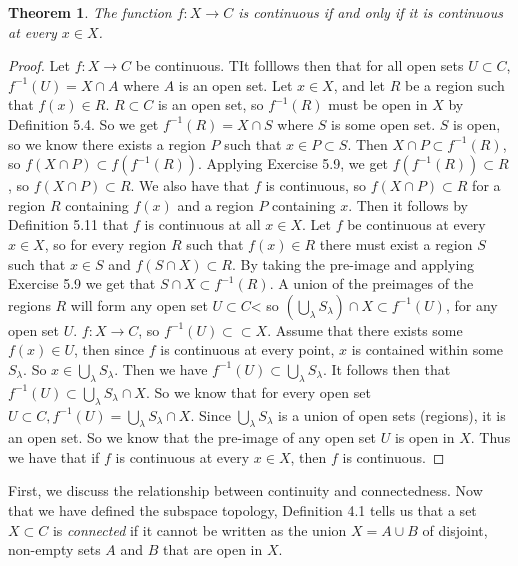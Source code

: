 \documentclass[12pt]{article}
\renewcommand{\_}[1]{\underline{ #1 }}
\newtheorem{theorem}{Theorem}[section]
\theoremstyle{definition}
\numberwithin{equation}{subsection}
\begin{document}
\begin{theorem}\label{reformulation}
The function $f\colon X\to C$ is continuous if and only if it is continuous at every $x\in X$. 
\end{theorem}

\begin{proof}
Let $f : X \to C$ be continuous. TIt folllows then that for all open sets $U \subset C$, $f^{-1}(U) = X \cap A$ where $A$ is an open set. Let $x \in X$, and let $R$ be a region such that $f(x) \in R$. $R \subset C$ is an open set, so $f^{-1}(R)$ must be open in $X$ by Definition 5.4. So we get $f^{-1}(R) = X \cap S$ where $S$ is some open set. $S$ is open, so we know there exists a region $P$ such that $x \in P \subset S$. Then $X \cap P \subset f^{-1}(R)$, so $f(X \cap P) \subset f(f^{-1}(R))$. Applying Exercise 5.9, we get $f(f^{-1}(R)) \subset R$, so $f(X \cap P) \subset R$. We also have that $f$ is continuous, so $f(X \cap P) \subset R$ for a region $R$ containing $f(x)$ and a region $P$ containing $x$. Then it follows by Definition 5.11 that $f$ is continuous at all $x \in X$.
\newline
Let $f$ be continuous at every $x \in X$, so for every region $R$ such that $f(x) \in R$ there must exist a region $S$ such that $x \in S$ and $f(S \cap X) \subset R$. By taking the pre-image and applying Exercise 5.9 we get that $S \cap X \subset f^{-1}(R)$. A union of the preimages of the regions $R$ will form any open set $U \subset C$< so $(\bigcup_{\lambda}S_{\lambda}) \cap X \subset f^{-1}(U)$, for any open set $U$. $f : X \to C$, so $f^{-1}(U) \subset \subset X$. Assume that there exists some $f(x) \in U$, then since $f$ is continuous at every point, $x$ is contained within some $S_{\lambda}$. So $x \in \bigcup_{\lambda}S_{\lambda}$. Then we have $f^{-1}(U) \subset \bigcup_{\lambda}S_{\lambda}$. It follows then that $f^{-1}(U) \subset \bigcup_{\lambda}S_{\lambda} \cap X$. So we know that for every open set $U \subset C, f^{-1}(U) = \bigcup_{\lambda}S_{\lambda} \cap X$. Since $\bigcup_{\lambda}S_{\lambda}$ is a union of open sets (regions), it is an open set. So we know that the pre-image of any open set $U$ is open in $X$. Thus we have that if $f$ is continuous at every $x \in X$, then $f$ is continuous.
\end{proof}

First, we discuss the relationship between continuity and connectedness. Now that we have defined the subspace topology, Definition 4.1 tells us that a set $X\subset C$ is {\em connected} 
if it cannot be written as the union $X = A \cup B$ of disjoint, non-empty sets $A$ and $B$ that are open in $X$.
\end{document}
